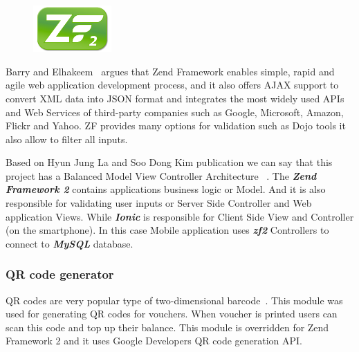 		\begin{figure}
			\includegraphics[width=3cm]{img/zf2/zf2-logo.png}
		\end{figure} 
		Barry and Elhakeem~\cite{ZendFramework-Security-Model} argues that Zend Framework enables simple, rapid and agile web application development process, and it also offers AJAX support to convert XML data into JSON format and integrates the most widely used APIs and Web Services of third-party companies such as Google, Microsoft, Amazon, Flickr and Yahoo. ZF provides many options for validation such as Dojo tools it also allow to filter all inputs.
		
		
		
		Based on Hyun Jung La and Soo Dong Kim publication we can say that this project has a Balanced Model View Controller Architecture ~\cite{MVC_Architecture_for_Developing_Service-based_Mobile_Applications}. The \textbf{\textit{Zend Framework 2}} contains applications business logic or Model. And it is also responsible for validating user inputs or Server Side Controller and  Web application Views. While \textbf{\textit{Ionic}} is responsible for Client Side View and Controller (on the smartphone). In this case Mobile application uses \textbf{\textit{zf2}} Controllers to connect to \textbf{\textit{MySQL}} database.


			\subsubsection{QR code generator}
			QR codes are very popular type of two-dimensional barcode~\cite{QR_code_google}. This module was used for generating QR codes for vouchers. When voucher is printed users can scan this code and top up their balance. This module is overridden  for Zend Framework 2 and it uses Google Developers QR code generation API.~\cite{QR_code_generator}
			
